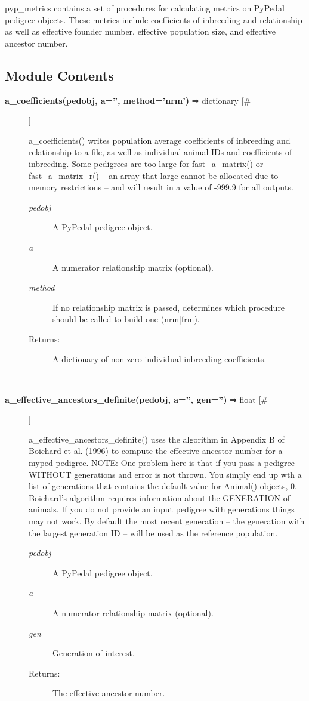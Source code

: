 

 pyp\_metrics contains a set of procedures for calculating metrics on PyPedal pedigree objects. These metrics include coefficients of inbreeding and relationship as well as effective founder number, effective population size, and effective ancestor number.
\subsection*{Module Contents}
\begin{description}
\item[\textbf{a\_coefficients(pedobj, a='', method='nrm')}
 ⇒ dictionary [\#]]

 a\_coefficients() writes population average coefficients of inbreeding and relationship to a file, as well as individual animal IDs and coefficients of inbreeding. Some pedigrees are too large for fast\_a\_matrix() or fast\_a\_matrix\_r() -- an array that large cannot be allocated due to memory restrictions -- and will result in a value of -999.9 for all outputs.
\begin{description}
\item[\emph{pedobj}
] A PyPedal pedigree object.
\item[\emph{a}
] A numerator relationship matrix (optional).
\item[\emph{method}
] If no relationship matrix is passed, determines which procedure should be called to build one (nrm|frm).
\item[Returns:] A dictionary of non-zero individual inbreeding coefficients.

\end{description}
\\ 

\item[\textbf{a\_effective\_ancestors\_definite(pedobj, a='', gen='')}
 ⇒ float [\#]]

 a\_effective\_ancestors\_definite() uses the algorithm in Appendix B of Boichard et al. (1996) to compute the effective ancestor number for a myped pedigree. NOTE: One problem here is that if you pass a pedigree WITHOUT generations and error is not thrown. You simply end up wth a list of generations that contains the default value for Animal() objects, 0. Boichard's algorithm requires information about the GENERATION of animals. If you do not provide an input pedigree with generations things may not work. By default the most recent generation -- the generation with the largest generation ID -- will be used as the reference population.
\begin{description}
\item[\emph{pedobj}
] A PyPedal pedigree object.
\item[\emph{a}
] A numerator relationship matrix (optional).
\item[\emph{gen}
] Generation of interest.
\item[Returns:] The effective ancestor number.


\end{description}
\end{description}
